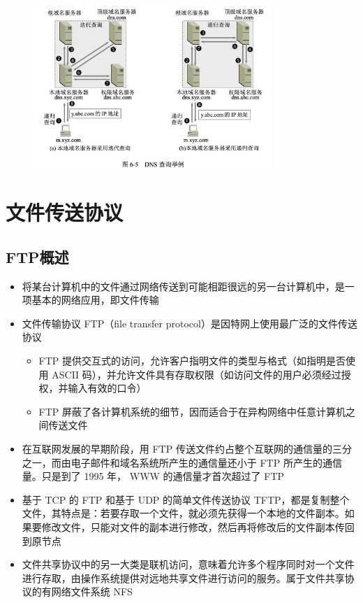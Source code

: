 \documentclass[cs4size,a4paper,10pt]{ctexart}
\begin{document}
	\begin{figure}[H]
		\centering
		\includegraphics[width=0.8\textwidth]{img/6.5}
	\end{figure}

	\section{文件传送协议}

	\subsection{FTP概述}

	\begin{itemize}
		\item 将某台计算机中的文件通过网络传送到可能相距很远的另一台计算机中，是一项基本的网络应用，即文件传输
		\item 文件传输协议 FTP（file transfer protocol）是因特网上使用最广泛的文件传送协议
		\begin{itemize}
			\item FTP 提供交互式的访问，允许客户指明文件的类型与格式（如指明是否使用 ASCII 码），并允许文件具有存取权限（如访问文件的用户必须经过授权，并输入有效的口令）
			\item FTP 屏蔽了各计算机系统的细节，因而适合于在异构网络中任意计算机之间传送文件
		\end{itemize}
		\item 在互联网发展的早期阶段，用 FTP 传送文件约占整个互联网的通信量的三分之一，而由电子邮件和域名系统所产生的通信量还小于 FTP 所产生的通信量。只是到了 1995 年， WWW 的通信量才首次超过了 FTP
		\item 基于 TCP 的 FTP 和基于 UDP 的简单文件传送协议 TFTP，都是复制整个文件，其特点是：若要存取一个文件，就必须先获得一个本地的文件副本。如果要修改文件，只能对文件的副本进行修改，然后再将修改后的文件副本传回到原节点
		\item 文件共享协议中的另一大类是联机访问，意味着允许多个程序同时对一个文件进行存取，由操作系统提供对远地共享文件进行访问的服务。属于文件共享协议的有网络文件系统 NFS
	\end{itemize}
\end{document}
